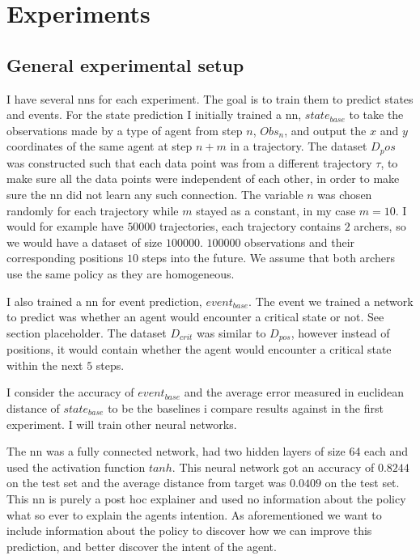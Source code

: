 \documentclass[UKenglish]{uiomasterthesis}
\begin{document}
\chapter{Experiments}
\section{General experimental setup}
I have several \acp{nn} for each experiment. The goal is to train them to predict states and events. For the state prediction I initially trained a \ac{nn}, $state_{base}$ to take the observations made by a type of agent from step $n$, $Obs_n$, and output the $x$ and $y$ coordinates of the same agent at step $n+m$ in a trajectory. The dataset $D_pos$ was constructed such that each data point was from a different trajectory $\tau$, to make sure all the data points were independent of each other, in order to make sure the \ac{nn} did not learn any such connection. The variable $n$ was chosen randomly for each trajectory while $m$ stayed as a constant, in my case $m=10$. I would for example have $50000$ trajectories, each trajectory contains $2$ archers, so we would have a dataset of size $100000$. $100000$ observations and their corresponding positions $10$ steps into the future. We assume that both archers use the same policy as they are homogeneous.

I also trained a \ac{nn} for event prediction, $event_{base}$. The event we trained a network to predict was whether an agent would encounter a critical state or not. See section placeholder. The dataset $D_{crit}$ was similar to $D_{pos}$, however instead of positions, it would contain whether the agent would encounter a critical state within the next $5$ steps. 

I consider the accuracy of $event_{base}$ and the average error measured in euclidean distance of $state_{base}$ to be the baselines i compare results against in the first experiment. I will train other neural networks.

The \ac{nn} was a fully connected network, had two hidden layers of size 64 each and used the activation function $tanh$. This neural network got an accuracy of $0.8244$ on the test set and the average distance from target was $0.0409$ on the test set. This \ac{nn} is purely a post hoc explainer and used no information about the policy what so ever to explain the agents intention. As aforementioned we want to include information about the policy to discover how we can improve this prediction, and better discover the intent of the agent.
\end{document}
